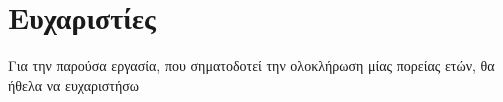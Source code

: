 \chapter*{Ευχαριστίες}

Για την παρούσα εργασία, που σηματοδοτεί την ολοκλήρωση μίας πορείας ετών, θα
ήθελα να ευχαριστήσω 
